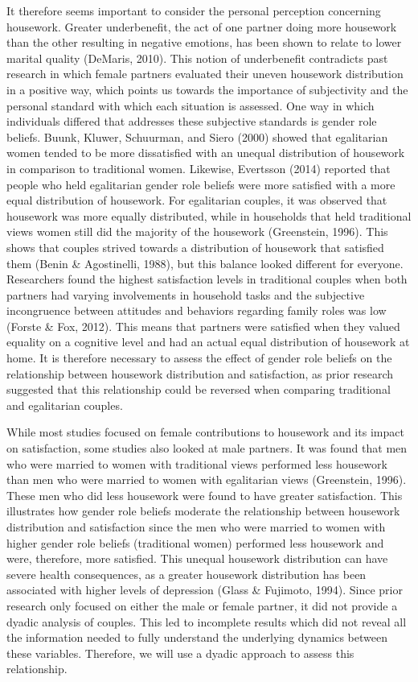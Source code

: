 \documentclass[
  man,floatsintext]{apa6}
\begin{document}
It therefore seems important to consider the personal perception concerning housework. Greater underbenefit, the act of one partner doing more housework than the other resulting in negative emotions, has been shown to relate to lower marital quality (DeMaris, 2010). This notion of underbenefit contradicts past research in which female partners evaluated their uneven housework distribution in a positive way, which points us towards the importance of subjectivity and the personal standard with which each situation is assessed. One way in which individuals differed that addresses these subjective standards is gender role beliefs. Buunk, Kluwer, Schuurman, and Siero (2000) showed that egalitarian women tended to be more dissatisfied with an unequal distribution of housework in comparison to traditional women. Likewise, Evertsson (2014) reported that people who held egalitarian gender role beliefs were more satisfied with a more equal distribution of housework. For egalitarian couples, it was observed that housework was more equally distributed, while in households that held traditional views women still did the majority of the housework (Greenstein, 1996). This shows that couples strived towards a distribution of housework that satisfied them (Benin \& Agostinelli, 1988), but this balance looked different for everyone. Researchers found the highest satisfaction levels in traditional couples when both partners had varying involvements in household tasks and the subjective incongruence between attitudes and behaviors regarding family roles was low (Forste \& Fox, 2012). This means that partners were satisfied when they valued equality on a cognitive level and had an actual equal distribution of housework at home. It is therefore necessary to assess the effect of gender role beliefs on the relationship between housework distribution and satisfaction, as prior research suggested that this relationship could be reversed when comparing traditional and egalitarian couples.

While most studies focused on female contributions to housework and its impact on satisfaction, some studies also looked at male partners. It was found that men who were married to women with traditional views performed less housework than men who were married to women with egalitarian views (Greenstein, 1996). These men who did less housework were found to have greater satisfaction. This illustrates how gender role beliefs moderate the relationship between housework distribution and satisfaction since the men who were married to women with higher gender role beliefs (traditional women) performed less housework and were, therefore, more satisfied. This unequal housework distribution can have severe health consequences, as a greater housework distribution has been associated with higher levels of depression (Glass \& Fujimoto, 1994). Since prior research only focused on either the male or female partner, it did not provide a dyadic analysis of couples. This led to incomplete results which did not reveal all the information needed to fully understand the underlying dynamics between these variables. Therefore, we will use a dyadic approach to assess this relationship.
\end{document}
